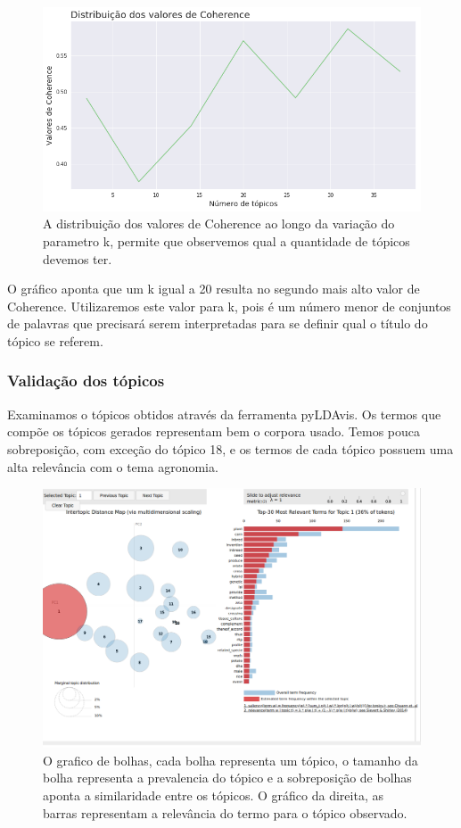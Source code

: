\begin{figure}[ht!]
	\centering
	\includegraphics[scale=0.6]{imagens/distr_dos_valores_de_coherence.png}
	\caption{A distribuição dos valores de Coherence ao longo da variação do parametro k, permite que observemos qual a quantidade de tópicos devemos ter.
			 \label{dist_coherence_image}}
\end{figure}

O gráfico aponta que um k igual a 20 resulta no segundo mais alto valor de Coherence. Utilizaremos este valor para k, pois é um número menor de conjuntos de palavras que precisará serem interpretadas para se definir qual o título do tópico se referem.

\subsubsection{Validação dos tópicos}

Examinamos o tópicos obtidos através da ferramenta pyLDAvis. Os termos que compõe os tópicos gerados  representam bem o corpora usado. Temos pouca sobreposição, com exceção do tópico 18, e os termos de cada tópico possuem uma alta relevância com o tema agronomia.  

\begin{figure}[ht!]
	\centering
	\includegraphics[scale=0.4]{imagens/construcao_dicionario1.png}
	\caption{O grafico de bolhas, cada bolha representa um tópico, o tamanho da bolha representa a prevalencia do tópico e a sobreposição de bolhas aponta a similaridade entre os tópicos. O gráfico da direita, as barras representam a relevância do termo para o tópico observado.
			 \label{pyLDAvis_image}}
\end{figure}

